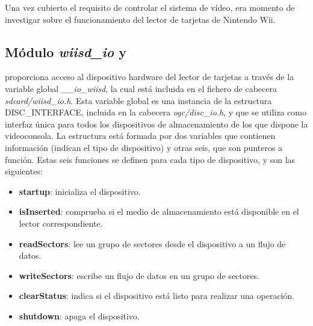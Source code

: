



Una vez cubierto el requisito de controlar el sistema de vídeo, era momento de investigar sobre el funcionamiento del lector de tarjetas de Nintendo Wii.

\subsection{Módulo \emph{wiisd\_io} y }

 proporciona acceso al dispositivo hardware del lector de tarjetas a través de la variable global \emph{\_\_io\_wiisd}, la cual está incluida en el fichero de cabecera \emph{sdcard/wiisd\_io.h}. Esta variable global es una instancia de la estructura DISC\_INTERFACE, incluida en la cabecera \emph{ogc/disc\_io.h}, y que se utiliza como interfaz única para todos los dispositivos de almacenamiento de los que dispone la videoconsola. La estructura está formada por dos variables que contienen información (indican el tipo de dispositivo) y otras seis, que son punteros a función. Estas seis funciones se definen para cada tipo de dispositivo, y son las siguientes:

\begin{itemize}
\item \textbf{startup}: inicializa el dispositivo.
\item \textbf{isInserted}: comprueba si el medio de almacenamiento está disponible en el lector correspondiente.
\item \textbf{readSectors}: lee un grupo de sectores desde el dispositivo a un flujo de datos.
\item \textbf{writeSectors}: escribe un flujo de datos en un grupo de sectores.
\item \textbf{clearStatus}: indica si el dispositivo está listo para realizar una operación.
\item \textbf{shutdown}: apaga el dispositivo.
\end{itemize}

